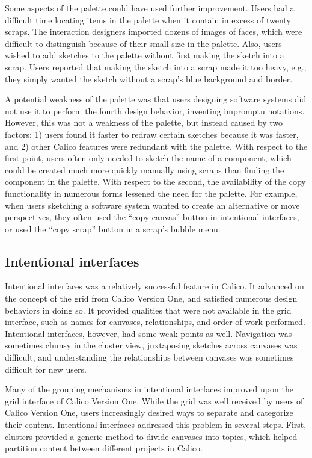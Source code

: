 \documentclass[12pt,fleqn]{ucithesis}
\begin{document}
Some aspects of the palette could have used further improvement. Users had a difficult time locating items in the palette when it contain in excess of twenty scraps. The interaction designers imported dozens of images of faces, which were difficult to distinguish because of their small size in the palette. Also, users wished to add sketches to the palette without first making the sketch into a scrap. Users reported that making the sketch into a scrap made it too heavy, e.g., they simply wanted the sketch without a scrap's blue background and border.

A potential weakness of the palette was that users designing software systems did not use it to perform the fourth design behavior, inventing impromptu notations. However, this was not a weakness of the palette, but instead caused by two factors: 1) users found it faster to redraw certain sketches because it was faster, and 2) other Calico features were redundant with the palette. With respect to the first point, users often only needed to sketch the name of a component, which could be created much more quickly manually using scraps than finding the component in the palette. With respect to the second, the availability of the copy functionality in numerous forms lessened the need for the palette. For example, when users sketching a software system wanted to create an alternative or move perspectives, they often used the ``copy canvas'' button in intentional interfaces, or used the ``copy scrap'' button in a scrap's bubble menu.

\subsection{Intentional interfaces}

Intentional interfaces was a relatively successful feature in Calico. It advanced on the concept of the grid from Calico Version One, and satisfied numerous design behaviors in doing so. It provided qualities that were not available in the grid interface, such as names for canvases, relationships, and order of work performed. Intentional interfaces, however, had some weak points as well. Navigation was sometimes clumsy in the cluster view, juxtaposing sketches across canvases was difficult, and understanding the relationships between canvases was sometimes difficult for new users.

Many of the grouping mechanisms in intentional interfaces improved upon the grid interface of Calico Version One. While the grid was well received by users of Calico Version One, users increasingly desired ways to separate and categorize their content. Intentional interfaces addressed this problem in several steps. First, clusters provided a generic method to divide canvases into topics, which helped partition content between different projects in Calico.
\end{document}
